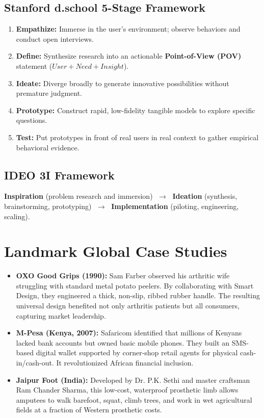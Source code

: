 \subsection{Stanford d.school 5-Stage Framework}
\begin{enumerate}[leftmargin=1.2em, itemsep=3pt]
    \item \textbf{Empathize:} Immerse in the user's environment; observe behaviors and conduct open interviews.
    \item \textbf{Define:} Synthesize research into an actionable \textbf{Point-of-View (POV)} statement ($User + Need + Insight$).
    \item \textbf{Ideate:} Diverge broadly to generate innovative possibilities without premature judgment.
    \item \textbf{Prototype:} Construct rapid, low-fidelity tangible models to explore specific questions.
    \item \textbf{Test:} Put prototypes in front of real users in real context to gather empirical behavioral evidence.
\end{enumerate}

\subsection{IDEO 3I Framework}
\textbf{Inspiration} (problem research and immersion) $\;\rightarrow\;$ \textbf{Ideation} (synthesis, brainstorming, prototyping) $\;\rightarrow\;$ \textbf{Implementation} (piloting, engineering, scaling).

\section{Landmark Global Case Studies}

\begin{example}
\begin{itemize}[leftmargin=1.2em, itemsep=3pt]
    \item \textbf{OXO Good Grips (1990):} Sam Farber observed his arthritic wife struggling with standard metal potato peelers. By collaborating with Smart Design, they engineered a thick, non-slip, ribbed rubber handle. The resulting universal design benefited not only arthritis patients but all consumers, capturing market leadership.
    \item \textbf{M-Pesa (Kenya, 2007):} Safaricom identified that millions of Kenyans lacked bank accounts but owned basic mobile phones. They built an SMS-based digital wallet supported by corner-shop retail agents for physical cash-in/cash-out. It revolutionized African financial inclusion.
    \item \textbf{Jaipur Foot (India):} Developed by Dr. P.K. Sethi and master craftsman Ram Chander Sharma, this low-cost, waterproof prosthetic limb allows amputees to walk barefoot, squat, climb trees, and work in wet agricultural fields at a fraction of Western prosthetic costs.
\end{itemize}
\end{example}


